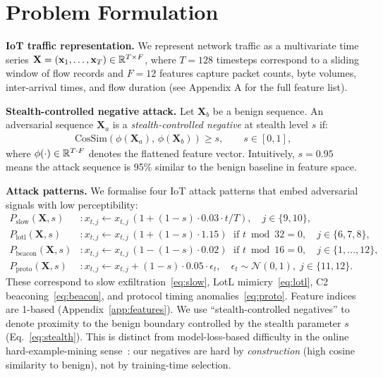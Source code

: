 \section{Problem Formulation}
\label{sec:problem}

\textbf{IoT traffic representation.}
We represent network traffic as a multivariate time series
$\mathbf{X} = (\mathbf{x}_1, \ldots, \mathbf{x}_T) \in \mathbb{R}^{T \times F}$,
where $T = 128$ timesteps correspond to a sliding window of flow records
and $F = 12$ features capture packet counts, byte volumes, inter-arrival
times, and flow duration (see Appendix A for the full feature list).

\textbf{Stealth-controlled negative attack.}
Let $\mathbf{X}_b$ be a benign sequence.  An adversarial sequence
$\mathbf{X}_a$ is a \emph{stealth-controlled negative} at stealth level $s$ if:
\begin{align}
  \label{eq:stealth}
  \text{CosSim}(\phi(\mathbf{X}_a),\, \phi(\mathbf{X}_b)) \geq s,
  \qquad s \in [0, 1],
\end{align}
where $\phi(\cdot) \in \mathbb{R}^{T \cdot F}$ denotes the flattened feature vector.
Intuitively, $s = 0.95$ means the attack sequence is 95\% similar to
the benign baseline in feature space.

\textbf{Attack patterns.}
We formalise four IoT attack patterns that embed adversarial signals
with low perceptibility:
\begin{align}
  P_{\text{slow}}(\mathbf{X}, s) &:
    x_{t,j} \leftarrow x_{t,j}\,(1 + (1-s) \cdot 0.03 \cdot t / T),
    \quad j \in \{9, 10\},
    \label{eq:slow} \\
  P_{\text{lotl}}(\mathbf{X}, s) &:
    x_{t,j} \leftarrow x_{t,j}\,(1 + (1-s) \cdot 1.15)
    \;\text{ if } t \bmod 32 = 0, \quad j \in \{6,7,8\},
    \label{eq:lotl} \\
  P_{\text{beacon}}(\mathbf{X}, s) &:
    x_{t,j} \leftarrow x_{t,j}\,(1 - (1-s) \cdot 0.02)
    \;\text{ if } t \bmod 16 = 0, \quad j \in \{1,\ldots,12\},
    \label{eq:beacon} \\
  P_{\text{proto}}(\mathbf{X}, s) &:
    x_{t,j} \leftarrow x_{t,j} + (1-s) \cdot 0.05 \cdot \epsilon_t,
    \quad \epsilon_t \sim \mathcal{N}(0,1),\; j \in \{11,12\}.
    \label{eq:proto}
\end{align}
These correspond to slow exfiltration~\eqref{eq:slow},
LotL mimicry~\eqref{eq:lotl}, C2 beaconing~\eqref{eq:beacon},
and protocol timing anomalies~\eqref{eq:proto}.
Feature indices are 1-based (Appendix~\ref{app:features}).
We use ``stealth-controlled negatives'' to denote proximity to
the benign boundary controlled by the stealth parameter $s$
(Eq.~\ref{eq:stealth}).
This is distinct from model-loss-based difficulty in the online
hard-example-mining sense~\cite{shrivastava2016ohem}: our negatives
are hard by \emph{construction} (high cosine similarity to benign),
not by training-time selection.

